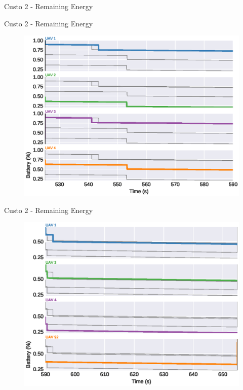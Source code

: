 \begin{frame}{Custo 2 - Remaining Energy}
\begin{figure}[!htb]
                    \end{figure}
                \end{frame}\begin{frame}{Custo 2 - Remaining Energy}
                    \begin{figure}[!htb]
                        \includegraphics[width=\textwidth]{custo_2/uav_remaining_energy_590.eps}
                    \end{figure}
                \end{frame}\begin{frame}{Custo 2 - Remaining Energy}
                    \begin{figure}[!htb]
                        \includegraphics[width=\textwidth]{custo_2/uav_remaining_energy_655.eps}

\end{figure}
\end{frame}
